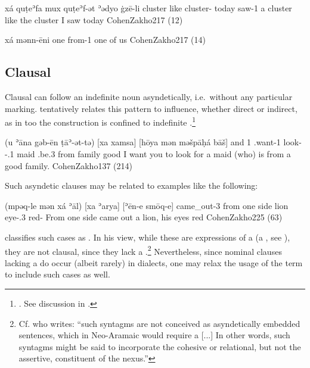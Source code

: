 {xá quṭeʾfa mux quṭeʾf-ət ʾədyo ġzē-li}
{\indef{} cluster like cluster-\cst{} today saw-1\sg}
{a cluster like the cluster I saw today}
{CohenZakho}{217 (12)}

{xá mənn-ēni}
{one from-1\pl}
{one of us}
{CohenZakho}{217 (14)}





\subsection{Clausal \secns} \label{ss:JZax_Asyndetic_Rel_Clauses}

Clausal \secns can follow an indefinite \prim noun asyndetically, i.e.\ without any particular marking. \citet[138]{CohenZakho} tentatively relates this pattern to  influence, whether direct or indirect, as in  too the construction is confined to indefinite \prims.\footnote{. See discussion in .}

{(u\cb{} ʾāna gəb-ēn ṭāʾ-ət-tə) [xa xamsa] [hōya mən məšpāḥá bāš]}
{and\cb{} 1\sg{} \ind.want-1\sg{} look-\masc{}-\dat.1\sg{} \indef{} maid \sbjv.be.3\masc{} from family good }
{I want you to look for a maid (who) is from a good family.}
{CohenZakho}{137 (214)}


Such asyndetic clauses may be related to examples like the following:

{(mpəq-le mən xá\cb{} ʾāl) [xa ʾarya] [ʾēn-e smōq-e]}
{came\_out-3\masc{} from one\cb{} side \indef{} lion eye-\poss.3\masc{} red-\pl}
{From one side came out a lion, his eyes red}
{CohenZakho}{225 (63)}

\citet[225]{CohenZakho} classifies such cases as . In his view, while these are expressions of a  (a , see ), they are not clausal, since they lack a .\footnote{Cf. \citet[257]{GoldenbergSemitic} who writes: \enquote{such syntagms are not conceived as asyndetically embedded sentences, which in Neo-Aramaic would require a  [...] In other words, such syntagms might be said to incorporate the cohesive or relational, but not the assertive, constituent of the nexus.}} Nevertheless, since nominal clauses lacking a  do occur (albeit rarely) in  dialects, one may relax the usage of the term  to include such cases as well. 


